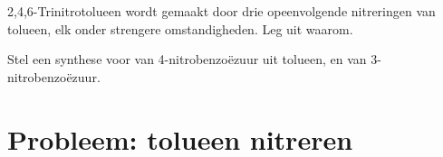 \begin{exercise}[$\star\star\star$]\label{exo:b2:aromatic-substitution:11}
2,4,6-Trinitrotolueen wordt gemaakt door drie opeenvolgende nitreringen van tolueen, elk onder strengere
omstandigheden. Leg uit waarom.
\end{exercise}

\begin{exercise}[$\star\star\star$]\label{exo:b2:aromatic-substitution:12}
Stel een synthese voor van 4-nitrobenzoëzuur uit tolueen, en van 3-nitrobenzoëzuur.
\end{exercise}

\section{Probleem: tolueen nitreren}

